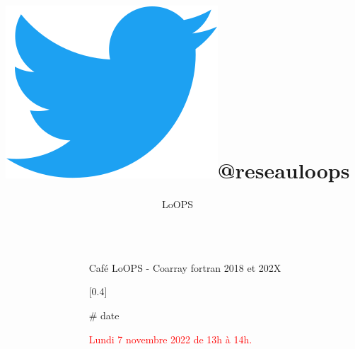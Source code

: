 \documentclass[final]{beamer}
\title{\includegraphics[width=0.05\linewidth]{Twitter_Bird.png}@reseauloops}%
\author{LoOPS} %
\institute{@reseauloops} %
\newlength{\sepwid}
\newlength{\twocolwid}
\begin{document}

\setlength{\belowcaptionskip}{3ex} %
\setlength\belowdisplayshortskip{3ex} %


\begin{frame}[t] %

\begin{columns}[t] %

\begin{column}{\sepwid}\end{column} %

\begin{column}{\twocolwid} %


\begin{alertblock}{\Large{Caf\'{e} LoOPS - Coarray fortran 2018 et 202X}}
\end{alertblock}


\centering
\raisebox{-0.3\totalheight}[0.4\totalheight]{}

\vspace{1in}

\begin{block}{\# date}

{\textcolor{red}{
     Lundi 7 novembre 2022 de 13h \`{a} 14h.
}}


\end{block}
\end{column}
\end{columns}
\end{frame}
\end{document}
